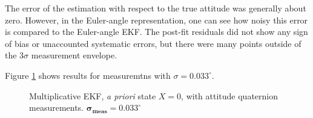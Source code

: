 \documentclass[]{aiaa-tc}%
\begin{document}
The error of the estimation with respect to the true attitude was generally about zero. However, in the Euler-angle representation, one can see how noisy this error is compared to the Euler-angle EKF. The post-fit residuals did not show any sign of bias or unaccounted systematic errors, but there were many points outside of the 3$\sigma$ measurement envelope. 

	\vspace{5 mm}

Figure \ref{fig:MEKFResultsMoreAcc} shows results for measuremtns with $\sigma=0.033^\circ$.
	\begin{figure}[H]
		\centering
		\caption{Multiplicative EKF, \textit{a priori} state $X=0$, with attitude quaternion measurements. $\boldsymbol{\sigma}\mathbf{_{meas}=0.033^\circ}$ }
		\label{fig:MEKFResultsMoreAcc}
	\end{figure}	
\end{document}
